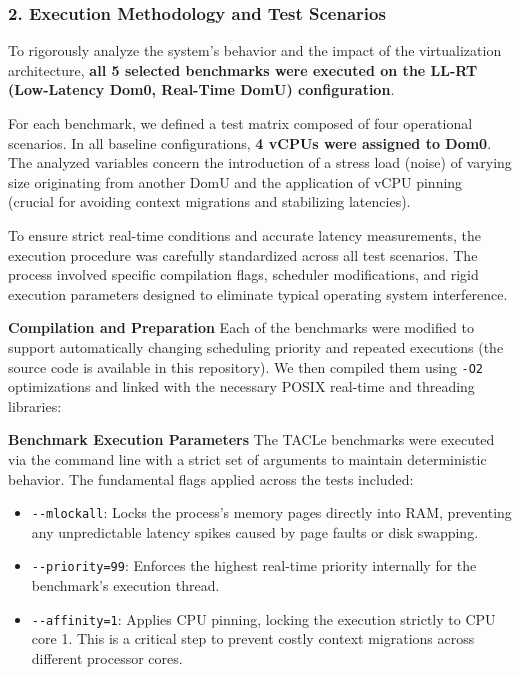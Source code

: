\subsubsection{2. Execution Methodology and Test
Scenarios}\label{execution-methodology-and-test-scenarios-1}

To rigorously analyze the system's behavior and the impact of the
virtualization architecture, \textbf{all 5 selected benchmarks were
executed on the LL-RT (Low-Latency Dom0, Real-Time DomU) configuration}.

For each benchmark, we defined a test matrix composed of four
operational scenarios. In all baseline configurations, \textbf{4 vCPUs
were assigned to Dom0}. The analyzed variables concern the introduction
of a stress load (noise) of varying size originating from another DomU
and the application of vCPU pinning (crucial for avoiding context
migrations and stabilizing latencies).

To ensure strict real-time conditions and accurate latency measurements,
the execution procedure was carefully standardized across all test
scenarios. The process involved specific compilation flags, scheduler
modifications, and rigid execution parameters designed to eliminate
typical operating system interference.

\textbf{Compilation and Preparation} Each of the benchmarks were
modified to support automatically changing scheduling priority and
repeated executions (the source code is available in this repository).
We then compiled them using \texttt{-O2} optimizations and linked with
the necessary POSIX real-time and threading libraries:

\begin{Shaded}
\begin{Highlighting}[]
\end{Highlighting}
\end{Shaded}

\textbf{Benchmark Execution Parameters} The TACLe benchmarks were
executed via the command line with a strict set of arguments to maintain
deterministic behavior. The fundamental flags applied across the tests
included:

\begin{itemize}
\item
  \texttt{-\/-mlockall}: Locks the process's memory pages directly into
  RAM, preventing any unpredictable latency spikes caused by page faults
  or disk swapping.
\item
  \texttt{-\/-priority=99}: Enforces the highest real-time priority
  internally for the benchmark's execution thread.
\item
  \texttt{-\/-affinity=1}: Applies CPU pinning, locking the execution
  strictly to CPU core 1. This is a critical step to prevent costly
  context migrations across different processor cores.
\end{itemize}

